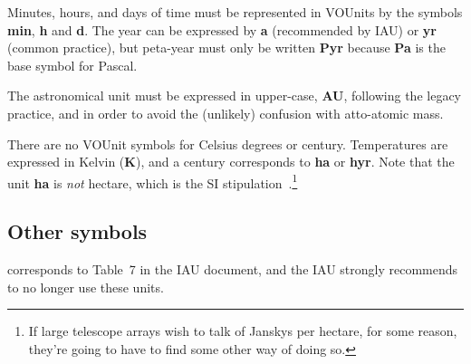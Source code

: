 \documentclass[12pt,notitlepage,onecolumn]{ivoa}
\newcommand{\unit}[1]{\textbf{\textsf{\color{orange}#1}}}
\begin{document}
Minutes, hours, and days of time must be represented in VOUnits by the symbols \unit{min}, \unit{h} and \unit{d}.
The year can be expressed by \unit{a} (recommended by IAU) or \unit{yr} (common practice), but peta-year must only
be written \unit{Pyr} because \unit{Pa} is the base symbol for Pascal.

The astronomical unit must be expressed in upper-case, \unit{AU}, following the legacy practice, and in order to
avoid the (unlikely) confusion with atto-atomic mass.

There are no VOUnit symbols for Celsius degrees or century. Temperatures are expressed in Kelvin (\unit{K}),
and a century corresponds to \unit{ha} or \unit{hyr}. Note
  that the unit \unit{ha} is \emph{not} hectare, which is the SI
  stipulation~\citep{si-brochure}.\footnote{If large telescope arrays 
    wish to talk of Janskys per hectare, for some reason, they're going
    to have to find some other way of doing so.}


\subsection{Other symbols}

 corresponds to Table~7 in the IAU document, and the IAU strongly
recommends to no longer use these units. 
\end{document}
